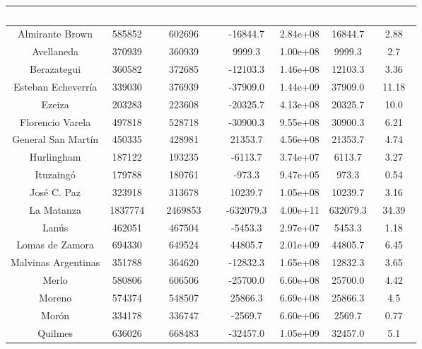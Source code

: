 \begin{table}[htb]
\centering
\begin{tabular}{|c|c|c|c|c|c|c|}
\hline
\textbf{\cellcolor[rgb]{0,0.231,0.427}\textcolor{white}{nam}} & \textbf{\cellcolor[rgb]{0,0.231,0.427}\textcolor{white}{$real_2022$}} & \textbf{\cellcolor[rgb]{0,0.231,0.427}\textcolor{white}{$prediction_2022$}} & \textbf{\cellcolor[rgb]{0,0.231,0.427}\textcolor{white}{AbsError}} & \textbf{\cellcolor[rgb]{0,0.231,0.427}\textcolor{white}{MSE}} & \textbf{\cellcolor[rgb]{0,0.231,0.427}\textcolor{white}{RMSE}} & \textbf{\cellcolor[rgb]{0,0.231,0.427}\textcolor{white}{MAPE}} \\ \hline
Almirante Brown & 585852 & 602696 & -16844.7 & 2.84e+08 & 16844.7 & 2.88 \\
Avellaneda & 370939 & 360939 & 9999.3 & 1.00e+08 & 9999.3 & 2.7 \\
Berazategui & 360582 & 372685 & -12103.3 & 1.46e+08 & 12103.3 & 3.36 \\
Esteban Echeverría & 339030 & 376939 & -37909.0 & 1.44e+09 & 37909.0 & 11.18 \\
Ezeiza & 203283 & 223608 & -20325.7 & 4.13e+08 & 20325.7 & 10.0 \\
Florencio Varela & 497818 & 528718 & -30900.3 & 9.55e+08 & 30900.3 & 6.21 \\
General San Martín & 450335 & 428981 & 21353.7 & 4.56e+08 & 21353.7 & 4.74 \\
Hurlingham & 187122 & 193235 & -6113.7 & 3.74e+07 & 6113.7 & 3.27 \\
Ituzaingó & 179788 & 180761 & -973.3 & 9.47e+05 & 973.3 & 0.54 \\
José C. Paz & 323918 & 313678 & 10239.7 & 1.05e+08 & 10239.7 & 3.16 \\
La Matanza & 1837774 & 2469853 & -632079.3 & 4.00e+11 & 632079.3 & 34.39 \\
Lanús & 462051 & 467504 & -5453.3 & 2.97e+07 & 5453.3 & 1.18 \\
Lomas de Zamora & 694330 & 649524 & 44805.7 & 2.01e+09 & 44805.7 & 6.45 \\
Malvinas Argentinas & 351788 & 364620 & -12832.3 & 1.65e+08 & 12832.3 & 3.65 \\
Merlo & 580806 & 606506 & -25700.0 & 6.60e+08 & 25700.0 & 4.42 \\
Moreno & 574374 & 548507 & 25866.3 & 6.69e+08 & 25866.3 & 4.5 \\
Morón & 334178 & 336747 & -2569.7 & 6.60e+06 & 2569.7 & 0.77 \\
Quilmes & 636026 & 668483 & -32457.0 & 1.05e+09 & 32457.0 & 5.1 \\

\end{tabular}
\end{table}
